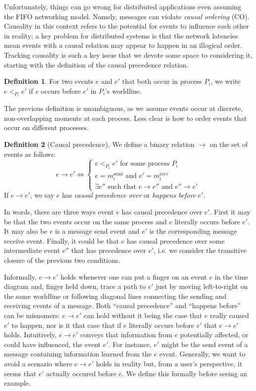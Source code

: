 \documentclass[]             %
{NASA}                       %
\theoremstyle{definition}
\newtheorem{definition}{Definition}[section]
\begin{document}
Unfortunately, things can go wrong for distributed applications even
assuming the FIFO networking model. Namely, messages can violate
\emph{causal ordering} (CO). Causality in this context refers to the
potential for events to influence each other in reality; a key problem
for distributed systems is that the network latencies mean events with
a causal relation may appear to happen in an illogical order. Tracking
causality is such a key issue that we devote some space to considering
it, starting with the definition of the causal precedence relation.

\begin{definition}
  For two events $e$ and $e'$ that both occur in process $P_i$, we
  write $e <_{P_i} e'$ if $e$ occurs before $e'$ in $P_i$'s
  worldline.
\end{definition}
The previous definition is unambiguous, as we assume events occur at
discrete, non-overlapping moments at each process. Less clear is how
to order events that occur on different processes.

\begin{definition}[Causal precedence]
  We define a binary relation $\to$ on the set of events as follows:
  \[e \to e' \iff \begin{cases} e <_{P_i} e' \textrm{ for some process $P_i$} \\
    e = m_i^\textrm{send} \textrm{ and } e' = m_i^\textrm{recv} \\
    \exists e'' \textrm{ such that } e \to e'' \textrm{ and } e'' \to e'
  \end{cases}
  \]
  If $e \to e'$, we say $e$ has \emph{causal precedence over} or
  \emph{happens before} $e'$.
\end{definition}
In words, there are three ways event $e$ has causal precedence over
$e'$.  First it may be that the two events occur on the same process
and $e$ literally occurs before $e'$. It may also be $e$ is a message
send event and $e'$ is the corresponding message receive
event. Finally, it could be that $e$ has causal precedence over some
intermediate event $e''$ that has precedence over $e'$, i.e. we
consider the transitive closure of the previous two conditions.

Informally, $e \to e'$ holds whenever one can put a finger on an event
$e$ in the time diagram and, finger held down, trace a path to $e'$
just by moving left-to-right on the same worldline or following
diagonal lines connecting the sending and receiving events of a
message. Both ``causal precedence'' and ``happens before'' can be
misnomers: $e \to e'$ can hold without it being the case that $e$
really caused $e'$ to happen, nor is it that case that if $e$
literally occurs before $e'$ that $e \to e'$ holds. Intuitively, $e
\to e'$ conveys that information from $e$ potentially affected, or
could have influenced, the event $e'$. For instance, $e'$ might be the
send event of a message containing information learned from the $e$
event. Generally, we want to avoid a scenario where $e \to e'$ holds
in reality but, from a user's perspective, it seems that $e'$ actually
occured before $e$. We define this formally before seeing an example.
\end{document}
